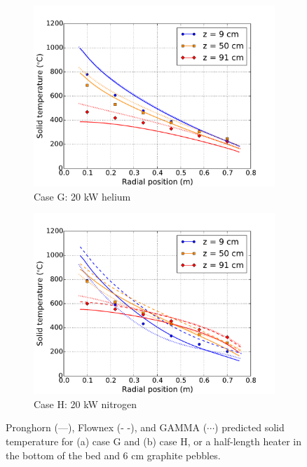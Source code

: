 \begin{figure}[h!]
    \begin{subfigure}{0.5\linewidth}
        \centering
        \includegraphics[height=0.75\linewidth]{figs/exp_total_U2.pdf}
       \caption{Case G: 20 \si{\kilo\watt} helium}
    \end{subfigure}
    \begin{subfigure}{0.5\linewidth}
        \centering
        \includegraphics[height=0.75\linewidth]{figs/exp_total_Y2.pdf}
        \caption{Case H: 20 \si{\kilo\watt} nitrogen}
    \end{subfigure}
    \caption{Pronghorn (---), Flownex (- -), and GAMMA (\(\cdots\)) predicted solid temperature for (a) case G and (b) case H, or a half-length heater in the bottom of the bed and 6 \si{\centi\meter} graphite pebbles.}
    \label{fig:bottom}
\end{figure}

